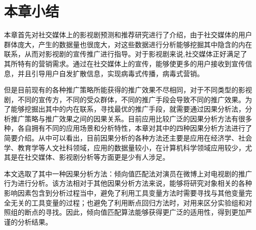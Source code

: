 \section{本章小结}

本章首先对社交媒体上的影视剧预测和推荐研究进行了介绍，由于社交媒体的用户群体庞大，产生的数据量也很庞大，对这些数据进行分析能够挖掘其中隐含的内在联系，从而对影视剧的宣传推广进行指导。对于影视剧来说,社交媒体正好满足了其所特有的营销需求。通过在社交媒体上的宣传，能够使更多的用户接收到宣传信息，并且引导用户自发扩散信息，实现病毒式传播，病毒式营销。

但是目前现有的各种推广策略所能获得的推广效果不尽相同，对于不同类型的影视剧，不同的宣传方，不同的受众群体，不同的推广手段会导致不同的推广效果。为了能够挖掘出其中的内在联系，寻找最优的推广手段，就需要通过因果分析法，分析推广策略与推广效果之间的因果关系。目前应用比较广泛的因果分析方法有很多种，各自拥有不同的应用场景和分析特性，本章对其中的四种因果分析方法进行了简要介绍。从中可以看出，目前因果分析的各种方法还主要是应用在经济学、社会学、教育学等人文社科领域，应用的数据量较小，在计算机科学领域应用较少，尤其是在社交媒体、影视剧分析等方面更是少有人涉足。

本文选取了其中一种因果分析方法：倾向值匹配法对演员在微博上对电视剧的推广行为进行分析。该方法相对于其他因果分析方法来说，能够将研究对象相关的各种影响因素包含到分析过程当中，避免了利用工具变量方法时需要寻找与其他变量完全无关的工具变量的过程；也避免了利用断点回归方法时，对用来区分实验组和对照组的断点的寻找。因此，倾向值匹配算法能够获得更广泛的适用性，得到更加严谨的分析结果。




























































